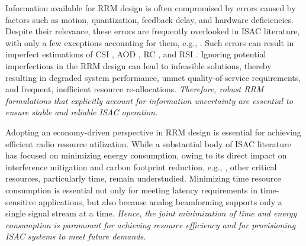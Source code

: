 \documentclass[10pt,journal,compsoc]{IEEEtran}
\theoremstyle{myremark}
\theoremstyle{myexample}
\begin{document}
Information available for \gls{RRM} design is often compromised by errors caused by factors such as motion, quantization, feedback delay, and hardware deficiencies. Despite their relevance, these errors are frequently overlooked in \gls{ISAC} literature, with only a few exceptions accounting for them, e.g., \cite{xu2023:sensing-enhanced-secure-communication-joint-time-allocation-beamforming-design, jia2024:physical-layer-security-optimization-cramer-rao-bound-metric-isac-systems-sensing-specific-imperfect-csi-model, lyu2024:dual-robust-integrated-sensing-communication-beamforming-csi-imperfection-location-uncertainty, khalili2024:advanced-isac-design-movable-antennas-accounting-dynamic-rcs, tang2021:self-interference-resistant-ieee-802-11-ad-based-joint-communication-automotive-radar-design}. Such errors can result in imperfect estimations of \gls{CSI} \cite{jia2024:physical-layer-security-optimization-cramer-rao-bound-metric-isac-systems-sensing-specific-imperfect-csi-model, lyu2024:dual-robust-integrated-sensing-communication-beamforming-csi-imperfection-location-uncertainty}, \gls{AOD} \cite{xu2023:sensing-enhanced-secure-communication-joint-time-allocation-beamforming-design, lyu2024:dual-robust-integrated-sensing-communication-beamforming-csi-imperfection-location-uncertainty}, \gls{RC} \cite{xu2023:sensing-enhanced-secure-communication-joint-time-allocation-beamforming-design, khalili2024:advanced-isac-design-movable-antennas-accounting-dynamic-rcs}, and \gls{RSI} \cite{tang2021:self-interference-resistant-ieee-802-11-ad-based-joint-communication-automotive-radar-design}. Ignoring potential imperfections in the \gls{RRM} design can lead to infeasible solutions, thereby resulting in degraded system performance, unmet quality-of-service requirements, and frequent, inefficient resource re-allocations. \emph{Therefore, robust \gls{RRM} formulations that explicitly account for information uncertainty are essential to ensure stable and reliable \gls{ISAC} operation.}
 


 
Adopting an economy-driven perspective in \gls{RRM} design is essential for achieving efficient radio resource utilization. While a substantial body of \gls{ISAC} literature has focused on minimizing energy consumption, owing to its direct impact on interference mitigation and carbon footprint reduction, e.g., \cite{he2023:full-duplex-communication-isac-joint-beamforming-power-optimization, huang2022:coordinated-power-control-network-integrated-sensing-communication, khalili2024:advanced-isac-design-movable-antennas-accounting-dynamic-rcs}, other critical resources, particularly time, remain understudied. Minimizing time resource consumption is essential not only for meeting latency requirements in time-sensitive applications, but also because analog beamforming supports only a single signal stream at a time. \emph{Hence, the joint minimization of time and energy consumption is paramount for achieving resource efficiency and for provisioning \gls{ISAC} systems to meet future demands.}
\end{document}
